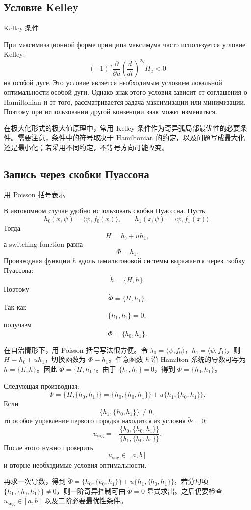 \documentclass[12pt,a4paper]{article}
\newcommand{\sng}{\mathrm{sng}}
\newcommand{\zh}[1]{\par\noindent #1\par}
\begin{document}
\subsection*{Условие Kelley}
\zh{Kelley 条件}
При максимизационной форме принципа максимума часто используется условие Kelley:
\[
(-1)^q
\frac{\partial}{\partial u}
\left(\frac{d}{dt}\right)^{2q}H_u
<0
\]
на особой дуге. Это условие является необходимым условием локальной оптимальности особой дуги. Однако знак этого условия зависит от соглашения о Hamiltonian и от того, рассматривается задача максимизации или минимизации. Поэтому при использовании другой конвенции знак может измениться.
\zh{在极大化形式的极大值原理中，常用 Kelley 条件作为奇异弧局部最优性的必要条件。需要注意，条件中的符号取决于 Hamiltonian 的约定，以及问题写成最大化还是最小化；若采用不同约定，不等号方向可能改变。}

\subsection*{Запись через скобки Пуассона}
\zh{用 Poisson 括号表示}
В автономном случае удобно использовать скобки Пуассона. Пусть
\[
h_0(x,\psi)=\langle \psi,f_0(x)\rangle,
\qquad
h_1(x,\psi)=\langle \psi,f_1(x)\rangle.
\]
Тогда
\[
H=h_0+u h_1,
\]
а switching function равна
\[
\Phi=h_1.
\]
Производная функции $h$ вдоль гамильтоновой системы выражается через скобку Пуассона:
\[
\dot h=\{H,h\}.
\]
Поэтому
\[
\dot\Phi=\{H,h_1\}.
\]
Так как
\[
\{h_1,h_1\}=0,
\]
получаем
\[
\dot\Phi=\{h_0,h_1\}.
\]
\zh{在自治情形下，用 Poisson 括号写法很方便。令 \(h_0=\langle\psi,f_0\rangle\)，\(h_1=\langle\psi,f_1\rangle\)，则 \(H=h_0+uh_1\)，切换函数为 \(\Phi=h_1\)。任意函数 \(h\) 沿 Hamilton 系统的导数可写为 \(\dot h=\{H,h\}\)。因此 \(\dot\Phi=\{H,h_1\}\)。由于 \(\{h_1,h_1\}=0\)，得到 \(\dot\Phi=\{h_0,h_1\}\)。}
Следующая производная:
\[
\ddot\Phi
=
\{H,\{h_0,h_1\}\}
=
\{h_0,\{h_0,h_1\}\}
+
u\{h_1,\{h_0,h_1\}\}.
\]
Если
\[
\{h_1,\{h_0,h_1\}\}\ne0,
\]
то особое управление первого порядка находится из условия $\ddot\Phi=0$:
\[
u_{\sng}
=
-
\frac{\{h_0,\{h_0,h_1\}\}}
{\{h_1,\{h_0,h_1\}\}}.
\]
После этого нужно проверить
\[
u_{\sng}\in[a,b]
\]
и вторые необходимые условия оптимальности.
\zh{再求一次导数，得到 \(\ddot\Phi=\{h_0,\{h_0,h_1\}\}+u\{h_1,\{h_0,h_1\}\}\)。若分母项 \(\{h_1,\{h_0,h_1\}\}\ne0\)，则一阶奇异控制可由 \(\ddot\Phi=0\) 显式求出。之后仍要检查 \(u_{\sng}\in[a,b]\) 以及二阶必要最优性条件。}
\end{document}
